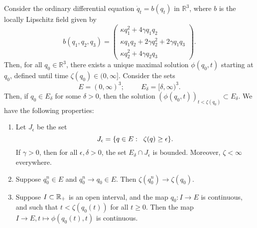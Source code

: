 \begin{lemma}\label{lemma: ODE considerations} Consider the ordinary differential equation $\dot{q}_t=b(q_t)$ in $\mathbb{R}^3$, where $b$ is the locally Lipschitz field given by \begin{equation} \label{eq: system of ODEs} b(q_1,q_2,q_3)=\begin{pmatrix}\kappa q_1^2+4\gamma q_1q_2 \\ \kappa q_1q_2+2\gamma q_2^2+2\gamma q_1q_3 \\ \kappa q_2^2 + 4\gamma q_2q_3 \end{pmatrix}. \end{equation} Then, for all $q_0\in \mathbb{R}^3$, there exists a unique maximal solution $\phi(q_0, t)$ starting at $q_0$, defined until time $\zeta(q_0)\in (0, \infty]$. Consider the sets \begin{equation} E=(0, \infty)^3; \hspace{1cm} E_\delta=[\delta,\infty)^3.\end{equation} Then, if $q_0 \in E_\delta$ for some $\delta>0$, then the solution $(\phi(q_0,t))_{t<\zeta(q_0)} \subset E_\delta$. We have the following properties: \begin{enumerate}[label=\roman{*}).] \item Let $J_\epsilon$ be the set \begin{equation} J_\epsilon  =\{q \in E: \hspace{0.2cm} \zeta(q)\ge\epsilon\}.\end{equation} If $\gamma>0$, then for all $\epsilon, \delta>0$, the set $E_\delta \cap J_\epsilon $ is bounded. Moreover, $\zeta<\infty$ everywhere. \item Suppose $q^n_0 \in E$ and $q^n_0 \rightarrow q_0 \in E$. Then $\zeta(q^n_0)\rightarrow \zeta(q_0).$ \item Suppose $I\subset \mathbb{R}_+$ is an open interval, and the map $q_0: I\rightarrow E$ is continuous, and such that $t<\zeta(q_0(t))$ for all $t\ge 0.$ Then the map $I\rightarrow E, t\mapsto \phi(q_0(t), t)$ is continuous. 
 \end{enumerate} \end{lemma} 

